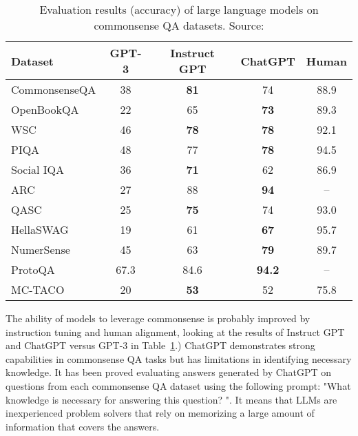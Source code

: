 \begin{table}[h!]
	\centering
	\small
	\begin{tabular}{|l|c|c|c|c|}
		\hline
		Dataset       & GPT-3 & Instruct GPT & ChatGPT       & Human \\
		\hline
		CommonsenseQA & 38    & \textbf{81}  & 74            & 88.9  \\
		OpenBookQA    & 22    & 65           & \textbf{73}   & 89.3  \\
		WSC           & 46    & \textbf{78}  & \textbf{78}   & 92.1  \\
		PIQA          & 48    & 77           & \textbf{78}   & 94.5  \\
		Social IQA    & 36    & \textbf{71}  & 62            & 86.9  \\
		ARC           & 27    & 88           & \textbf{94}   & --    \\
		QASC          & 25    & \textbf{75}  & 74            & 93.0  \\
		HellaSWAG     & 19    & 61           & \textbf{67}   & 95.7  \\
		NumerSense    & 45    & 63           & \textbf{79}   & 89.7  \\
		ProtoQA       & 67.3  & 84.6         & \textbf{94.2} & --    \\
		MC-TACO       & 20    & \textbf{53}  & 52            & 75.8  \\
		\hline
	\end{tabular}
	\caption{Evaluation results (accuracy) of large language models on commonsense QA datasets. Source: \textcite{bian2024chatgpt}}
	\label{tab:commonsense-results}
\end{table}
The ability of models to leverage commonsense is probably improved by instruction tuning and human alignment, looking at the results of Instruct GPT and ChatGPT versus GPT-3 in Table~\ref{tab:commonsense-results}.)
ChatGPT demonstrates strong capabilities in commonsense QA tasks but has limitations in identifying necessary knowledge.
It has been proved evaluating answers generated by ChatGPT on questions from each commonsense QA dataset using the following prompt: "What knowledge is necessary for answering this question? ".
It means that LLMs are inexperienced problem solvers that rely on memorizing a large amount of information that covers the answers.

